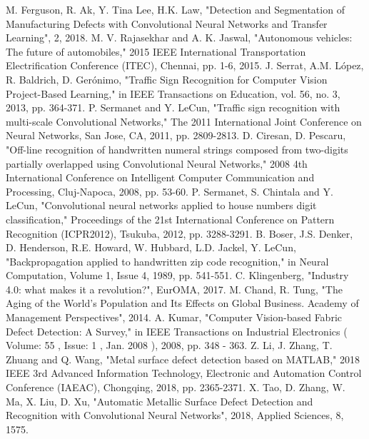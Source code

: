 \documentclass[12pt,a4paper,twoside]{report}
\begin{document}
\begin{thebibliography}{1}
M. Ferguson, R. Ak, Y. Tina Lee, H.K. Law, "Detection and Segmentation of Manufacturing Defects with Convolutional Neural Networks and Transfer Learning", 2, 2018.
M. V. Rajasekhar and A. K. Jaswal, "Autonomous vehicles: The future of automobiles," 2015 IEEE International Transportation Electrification Conference (ITEC), Chennai, pp. 1-6, 2015.
J. Serrat, A.M. López, R. Baldrich, D. Gerónimo, "Traffic Sign Recognition for Computer Vision Project-Based Learning," in IEEE Transactions on Education, vol. 56, no. 3, 2013, pp. 364-371.
P. Sermanet and Y. LeCun, "Traffic sign recognition with multi-scale Convolutional Networks," The 2011 International Joint Conference on Neural Networks, San Jose, CA, 2011, pp. 2809-2813.
D. Ciresan, D. Pescaru, "Off-line recognition of handwritten numeral strings composed from two-digits partially overlapped using Convolutional Neural Networks," 2008 4th International Conference on Intelligent Computer Communication and Processing, Cluj-Napoca, 2008, pp. 53-60.
P. Sermanet, S. Chintala and Y. LeCun, "Convolutional neural networks applied to house numbers digit classification," Proceedings of the 21st International Conference on Pattern Recognition (ICPR2012), Tsukuba, 2012, pp. 3288-3291.
B. Boser, J.S. Denker, D. Henderson, R.E. Howard, W. Hubbard, L.D. Jackel, Y. LeCun, "Backpropagation applied to handwritten zip code recognition," in Neural Computation, Volume 1, Issue 4, 1989, pp. 541-551.
C. Klingenberg, "Industry 4.0: what makes it a revolution?", EurOMA, 2017.
M. Chand, R. Tung, "The Aging of the World's Population and Its Effects on Global Business. Academy of Management Perspectives", 2014.
A. Kumar, "Computer Vision-based Fabric Defect Detection: A Survey," in IEEE Transactions on Industrial Electronics ( Volume: 55 , Issue: 1 , Jan. 2008 ), 2008, pp. 348 - 363.
Z. Li, J. Zhang, T. Zhuang and Q. Wang, "Metal surface defect detection based on MATLAB," 2018 IEEE 3rd Advanced Information Technology, Electronic and Automation Control Conference (IAEAC), Chongqing, 2018, pp. 2365-2371.
X. Tao, D. Zhang, W. Ma, X. Liu, D. Xu, "Automatic Metallic Surface Defect Detection and Recognition with Convolutional Neural Networks", 2018, Applied Sciences, 8, 1575.

\end{thebibliography}
\end{document}
